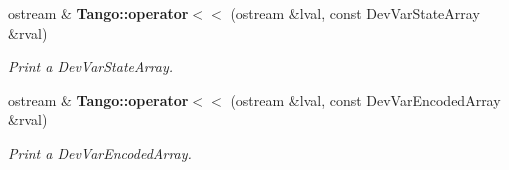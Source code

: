 \begin{DoxyCompactItemize}
ostream \& {\bf Tango\-::operator$<$$<$} (ostream \&lval, const Dev\-Var\-State\-Array \&rval)
\begin{DoxyCompactList}\small\item\em Print a Dev\-Var\-State\-Array. \end{DoxyCompactList}\item 
ostream \& {\bf Tango\-::operator$<$$<$} (ostream \&lval, const Dev\-Var\-Encoded\-Array \&rval)
\begin{DoxyCompactList}\small\item\em Print a Dev\-Var\-Encoded\-Array. \end{DoxyCompactList}\end{DoxyCompactItemize}
